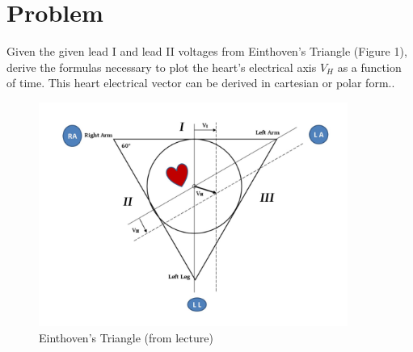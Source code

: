 \documentclass[12pt, a4paper]{article}
\begin{document}
\vspace*{-3mm}
\section*{Problem}
Given the given lead I and lead II voltages from Einthoven's Triangle (Figure 1), derive the formulas necessary to plot the heart’s electrical axis $V_H$ as a function of time. This heart electrical vector can be derived in cartesian or polar form..
\begin{figure}[h]
\caption{Einthoven's Triangle (from lecture)}
\centering
\includegraphics[width=0.9\textwidth]{heartdia}
\end{figure}
\pagebreak
\end{document}
